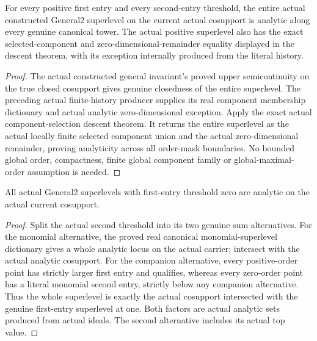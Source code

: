\begin{theorem}
\label{hir:general-two-positive-superlevel}
\leanok
For every positive first entry and every second-entry threshold, the entire
actual constructed General2 superlevel on the current actual cosupport is
analytic along every genuine canonical tower.
The actual positive superlevel also has the exact selected-component and
zero-dimensional-remainder equality displayed in the descent theorem,
with its exception internally produced from the literal history.
\end{theorem}
\begin{proof}
The actual constructed general invariant's proved upper semicontinuity
on the true closed cosupport gives genuine closedness of the entire
superlevel. The preceding actual finite-history producer supplies its real
component membership dictionary and actual analytic zero-dimensional
exception. Apply the exact actual component-selection descent theorem.
It returns the entire superlevel as the actual locally finite selected
component union and the actual zero-dimensional remainder, proving
analyticity across all order-mask boundaries. No bounded global order,
compactness, finite global component family or global-maximal-order
assumption is needed.
\end{proof}

\begin{theorem}
\label{hir:general-two-zero-superlevel}
\leanok
All actual General2 superlevels with first-entry threshold zero are analytic
on the actual current cosupport.
\end{theorem}
\begin{proof}
Split the actual second threshold into its two genuine sum alternatives.
For the monomial alternative, the proved real canonical monomial-superlevel
dictionary gives a whole analytic locus on the actual carrier; intersect
with the actual analytic cosupport. For the companion alternative, every
positive-order point has strictly larger first entry and qualifies, whereas
every zero-order point has a literal monomial second entry, strictly below
any companion alternative. Thus the whole superlevel is exactly the actual
cosupport intersected with the genuine first-entry superlevel at one.
Both factors are actual analytic sets produced from actual ideals.
The second alternative includes its actual top value.
\end{proof}

